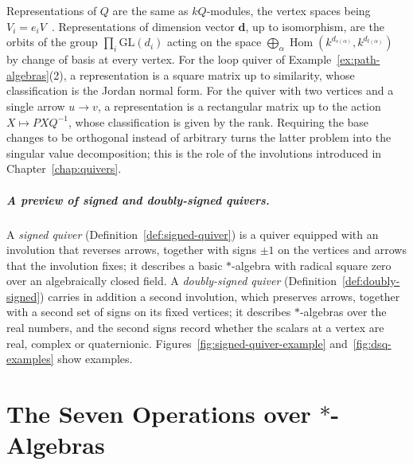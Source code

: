 \documentclass[12pt, a4paper]{report}
\theoremstyle{plain}
\theoremstyle{definition}
\theoremstyle{remark}
\theoremstyle{plain}
\newcommand{\GL}{\mathrm{GL}}
\DeclareMathOperator{\Hom}{Hom}
\begin{document}
Representations of $Q$ are the same as $kQ$-modules, the vertex spaces being $V_i=e_iV$~\cite{AssemSimsonSkowronski2006,Schiffler2014}. Representations of dimension vector $\mathbf d$, up to isomorphism, are the orbits of the group $\prod_i\GL(d_i)$ acting on the space $\bigoplus_{\alpha}\Hom(k^{d_{s(\alpha)}},k^{d_{t(\alpha)}})$ by change of basis at every vertex. For the loop quiver of Example~\ref{ex:path-algebras}(2), a representation is a square matrix up to similarity, whose classification is the Jordan normal form. For the quiver with two vertices and a single arrow $u\to v$, a representation is a rectangular matrix up to the action $X\mapsto PXQ^{-1}$, whose classification is given by the rank. Requiring the base changes to be orthogonal instead of arbitrary turns the latter problem into the singular value decomposition; this is the role of the involutions introduced in Chapter~\ref{chap:quivers}.

\paragraph{A preview of signed and doubly-signed quivers.}
A \emph{signed quiver} (Definition~\ref{def:signed-quiver}) is a quiver equipped with an involution that reverses arrows, together with signs $\pm1$ on the vertices and arrows that the involution fixes; it describes a basic $*$-algebra with radical square zero over an algebraically closed field. A \emph{doubly-signed quiver} (Definition~\ref{def:doubly-signed}) carries in addition a second involution, which preserves arrows, together with a second set of signs on its fixed vertices; it describes $*$-algebras over the real numbers, and the second signs record whether the scalars at a vertex are real, complex or quaternionic. Figures~\ref{fig:signed-quiver-example} and~\ref{fig:dsq-examples} show examples.
\chapter{The Seven Operations over \texorpdfstring{$*$}{*}-Algebras}
\label{chap:matrixops}
\end{document}

